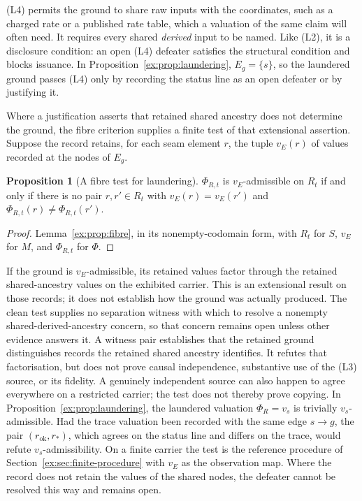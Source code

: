 \documentclass[11pt]{article}
\theoremstyle{definition}
\newtheorem{proposition}{Proposition}[section]
\begin{document}
(L4) permits the ground to share raw inputs with the coordinates, such as a charged rate or a published rate table, which a valuation of the same claim will often need. It requires every shared \emph{derived} input to be named. Like (L2), it is a disclosure condition: an open (L4) defeater satisfies the structural condition and blocks issuance. In Proposition~\ref{ex:prop:laundering}, $E_g=\{s\}$, so the laundered ground passes (L4) only by recording the status line as an open defeater or by justifying it.

Where a justification asserts that retained shared ancestry does not determine the ground, the fibre criterion supplies a finite test of that extensional assertion. Suppose the record retains, for each seam element $r$, the tuple $v_E(r)$ of values recorded at the nodes of $E_g$.

\begin{proposition}[A fibre test for laundering]\label{ex:prop:laundering-test}
$\Phi_{R,t}$ is $v_E$-admissible on $R_t$ if and only if there is no pair $r,r'\in R_t$ with $v_E(r)=v_E(r')$ and $\Phi_{R,t}(r)\neq\Phi_{R,t}(r')$.
\end{proposition}
\begin{proof}
Lemma~\ref{ex:prop:fibre}, in its nonempty-codomain form, with $R_t$ for $S$, $v_E$ for $M$, and $\Phi_{R,t}$ for $\Phi$.
\end{proof}

If the ground is $v_E$-admissible, its retained values factor through the retained shared-ancestry values on the exhibited carrier. This is an extensional result on those records; it does not establish how the ground was actually produced. The clean test supplies no separation witness with which to resolve a nonempty shared-derived-ancestry concern, so that concern remains open unless other evidence answers it. A witness pair establishes that the retained ground distinguishes records the retained shared ancestry identifies. It refutes that factorisation, but does not prove causal independence, substantive use of the (L3) source, or its fidelity. A genuinely independent source can also happen to agree everywhere on a restricted carrier; the test does not thereby prove copying. In Proposition~\ref{ex:prop:laundering}, the laundered valuation $\Phi_R=v_s$ is trivially $v_s$-admissible. Had the trace valuation been recorded with the same edge $s\to g$, the pair $(r_{\mathrm{ok}},r_*)$, which agrees on the status line and differs on the trace, would refute $v_s$-admissibility. On a finite carrier the test is the reference procedure of Section~\ref{ex:sec:finite-procedure} with $v_E$ as the observation map. Where the record does not retain the values of the shared nodes, the defeater cannot be resolved this way and remains open.
\end{document}

